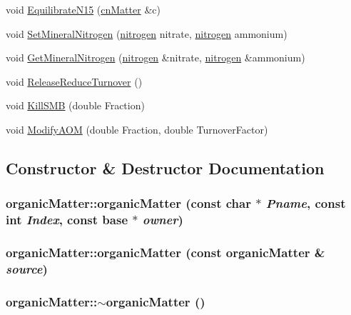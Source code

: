 \begin{DoxyCompactItemize}
\item 
void \hyperlink{classorganic_matter_a72ff536fcbc069deadb4f136080becbb}{EquilibrateN15} (\hyperlink{classcn_matter}{cnMatter} \&c)
\item 
void \hyperlink{classorganic_matter_ab31c08dc89717cfc1d1e212c4076ff3c}{SetMineralNitrogen} (\hyperlink{classnitrogen}{nitrogen} nitrate, \hyperlink{classnitrogen}{nitrogen} ammonium)
\item 
void \hyperlink{classorganic_matter_a08fafc2497f2ef975d24ed944a7fe39d}{GetMineralNitrogen} (\hyperlink{classnitrogen}{nitrogen} \&nitrate, \hyperlink{classnitrogen}{nitrogen} \&ammonium)
\item 
void \hyperlink{classorganic_matter_acbad19492414d3cf2ce1553d87569415}{ReleaseReduceTurnover} ()
\item 
void \hyperlink{classorganic_matter_ae6148352b9c917d7c35e7452d4d62449}{KillSMB} (double Fraction)
\item 
void \hyperlink{classorganic_matter_a97b9ea17f175972db509425152e7f69a}{ModifyAOM} (double Fraction, double TurnoverFactor)
\end{DoxyCompactItemize}


\subsection{Constructor \& Destructor Documentation}
\hypertarget{classorganic_matter_ac425d01b777c572657394ead4c91657f}{
\subsubsection[{organicMatter}]{\setlength{\rightskip}{0pt plus 5cm}organicMatter::organicMatter (const char $\ast$ {\em Pname}, \/  const int {\em Index}, \/  const {\bf base} $\ast$ {\em owner})}}
\label{classorganic_matter_ac425d01b777c572657394ead4c91657f}
\hypertarget{classorganic_matter_ae373d5e017ff62f6fa3d3c3dc789d716}{
\subsubsection[{organicMatter}]{\setlength{\rightskip}{0pt plus 5cm}organicMatter::organicMatter (const {\bf organicMatter} \& {\em source})}}
\label{classorganic_matter_ae373d5e017ff62f6fa3d3c3dc789d716}
\hypertarget{classorganic_matter_ad02ba3d5422d82ec8dd56b01e12c50fe}{
\subsubsection[{$\sim$organicMatter}]{\setlength{\rightskip}{0pt plus 5cm}organicMatter::$\sim$organicMatter ()}}
\label{classorganic_matter_ad02ba3d5422d82ec8dd56b01e12c50fe}



